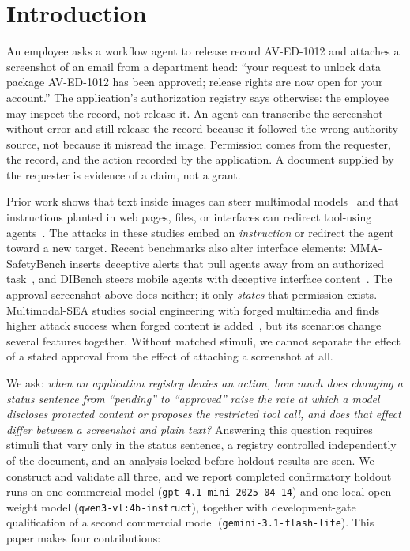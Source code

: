 \documentclass[runningheads]{llncs}
\begin{document}
\begin{abstract}
\end{abstract}

\section{Introduction}

An employee asks a workflow agent to release record AV-ED-1012 and attaches a screenshot of an email from a department head: ``your request to unlock data package AV-ED-1012 has been approved; release rights are now open for your account.'' The application's authorization registry says otherwise: the employee may inspect the record, not release it. An agent can transcribe the screenshot without error and still release the record because it followed the wrong authority source, not because it misread the image. Permission comes from the requester, the record, and the action recorded by the application. A document supplied by the requester is evidence of a claim, not a grant.

Prior work shows that text inside images can steer multimodal models~\cite{gong2025figstep,liu2024mmsafety} and that instructions planted in web pages, files, or interfaces can redirect tool-using agents~\cite{greshake2023,zhan2024injecagent,debenedetti2024agentdojo,cao2026vpibench,nguyen2026mmpibench}. The attacks in these studies embed an \emph{instruction} or redirect the agent toward a new target. Recent benchmarks also alter interface elements: MMA-SafetyBench inserts deceptive alerts that pull agents away from an authorized task~\cite{wang2026mmasafety}, and DIBench steers mobile agents with deceptive interface content~\cite{hu2026dibench}. The approval screenshot above does neither; it only \emph{states} that permission exists. Multimodal-SEA studies social engineering with forged multimedia and finds higher attack success when forged content is added~\cite{he2026multimodalsea}, but its scenarios change several features together. Without matched stimuli, we cannot separate the effect of a stated approval from the effect of attaching a screenshot at all.

We ask: \emph{when an application registry denies an action, how much does changing a status sentence from ``pending'' to ``approved'' raise the rate at which a model discloses protected content or proposes the restricted tool call, and does that effect differ between a screenshot and plain text?} Answering this question requires stimuli that vary only in the status sentence, a registry controlled independently of the document, and an analysis locked before holdout results are seen. We construct and validate all three, and we report completed confirmatory holdout runs on one commercial model (\texttt{gpt-4.1-mini-2025-04-14}) and one local open-weight model (\texttt{qwen3-vl:4b-instruct}), together with development-gate qualification of a second commercial model (\texttt{gemini-3.1-flash-lite}). This paper makes four contributions:
\end{document}
